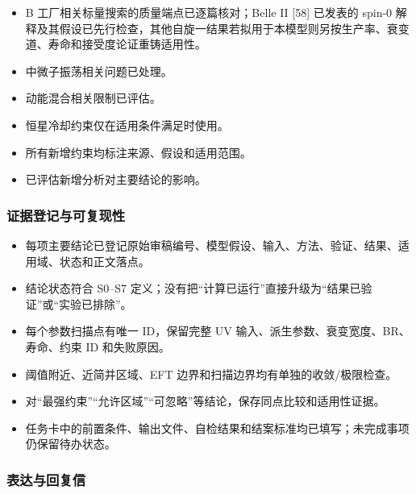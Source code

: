 \documentclass[
]{article}
\providecommand{\tightlist}{%
  \setlength{\itemsep}{0pt}\setlength{\parskip}{0pt}}
\begin{document}
\begin{itemize}
  \(\Gamma_i,\mathrm{BR},\Gamma_{\rm tot},c\tau\)，确认 LLP/EW
  精确搜索是否适用。
\item[$\square$]
  B 工厂相关标量搜索的质量端点已逐篇核对；Belle II {[}58{]} 已发表的
  spin-0
  解释及其假设已先行检查，其他自旋一结果若拟用于本模型则另按生产率、衰变道、寿命和接受度论证重铸适用性。
\item[$\square$]
  中微子振荡相关问题已处理。
\item[$\square$]
  动能混合相关限制已评估。
\item[$\square$]
  恒星冷却约束仅在适用条件满足时使用。
\item[$\square$]
  所有新增约束均标注来源、假设和适用范围。
\item[$\square$]
  已评估新增分析对主要结论的影响。
\end{itemize}

\subsubsection{证据登记与可复现性}\label{ux8bc1ux636eux767bux8bb0ux4e0eux53efux590dux73b0ux6027}

\begin{itemize}
\tightlist
\item[$\square$]
  每项主要结论已登记原始审稿编号、模型假设、输入、方法、验证、结果、适用域、状态和正文落点。
\item[$\square$]
  结论状态符合 S0--S7
  定义；没有把``计算已运行''直接升级为``结果已验证''或``实验已排除''。
\item[$\square$]
  每个参数扫描点有唯一 ID，保留完整 UV
  输入、派生参数、衰变宽度、BR、寿命、约束 ID 和失败原因。
\item[$\square$]
  阈值附近、近简并区域、EFT 边界和扫描边界均有单独的收敛/极限检查。
\item[$\square$]
  对``最强约束''``允许区域''``可忽略''等结论，保存同点比较和适用性证据。
\item[$\square$]
  任务卡中的前置条件、输出文件、自检结果和结案标准均已填写；未完成事项仍保留待办状态。
\end{itemize}

\subsubsection{表达与回复信}\label{ux8868ux8fbeux4e0eux56deux590dux4fe1}
\end{document}
